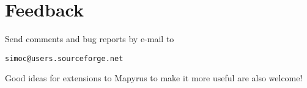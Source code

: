 
\section{Feedback}

Send comments and bug reports by e-mail to
\begin{alltt}
simoc@users.sourceforge.net
\end{alltt}

Good ideas for extensions to Mapyrus to make it more useful
are also welcome!
